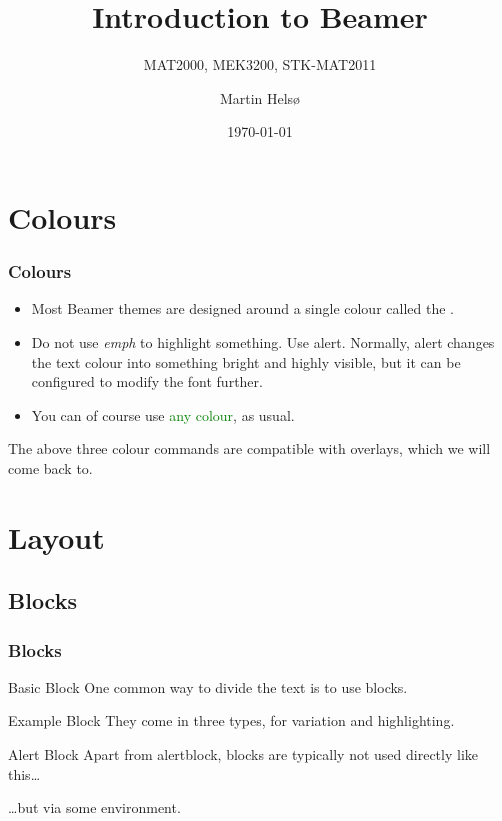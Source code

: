 \documentclass[UKenglish, unknownkeysallowed]{beamer}
\author[Helsø]{Martin Helsø}
\title[Beamer]{Introduction to Beamer}
\subtitle[Project work]{MAT2000, MEK3200, STK-MAT2011}
\institute[UiO]{University of Oslo}
\date[\the\day.\the\month.\the\year]{\today} %
\begin{document}
\begin{frame}
    \titlepage
\end{frame}


\section{Colours}


\begin{frame}
    \frametitle{Colours}

    \begin{itemize}
        \item
        Most Beamer themes are designed around a single colour called the .

        \item
        Do not use \emph{emph} to highlight something.
        Use \alert{alert}.
        Normally,
        \alert{alert} changes the text colour into something bright and highly visible,
        but it can be configured to modify the font further.

        \item
        You can of course use \textcolor{green}{any colour}, as usual.
    \end{itemize}

    The above three colour commands are compatible with overlays,
    which we will come back to.
\end{frame}


\section{Layout}
\subsection{Blocks}


\begin{frame}
    \frametitle{Blocks}

    \begin{block}{Basic Block}
        One common way to divide the text is to use blocks.
    \end{block}

    \begin{exampleblock}{Example Block}
        They come in three types, for variation and \alert{highlighting}.
    \end{exampleblock}

    \begin{alertblock}{Alert Block}
        Apart from \alert{alertblock},
        blocks are typically not used directly like this\ldots
    \end{alertblock}

    \begin{theorem}
         \ldots but via some environment.
    \end{theorem}
\end{frame}
\end{document}
